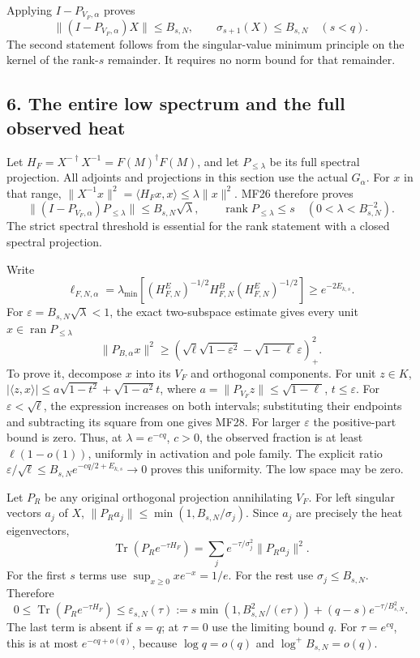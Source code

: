 \documentclass[11pt]{article}
\begin{document}
Applying \(I-P_{V_F,\alpha}\) proves \[
\|(I-P_{V_F,\alpha})X\|\le B_{s,N},\qquad
\sigma_{s+1}(X)\le B_{s,N}\quad(s<q).
\tag{MF26}
\] The second statement follows from the singular-value minimum principle on the kernel of the rank-\(s\) remainder. It requires no norm bound for that remainder.

\subsection{6. The entire low spectrum and the full observed heat}\label{the-entire-low-spectrum-and-the-full-observed-heat}

Let \(H_F=X^{-\dagger}X^{-1}=F(M)^\dagger F(M)\), and let \(P_{\le\lambda}\) be its full spectral projection. All adjoints and projections in this section use the actual \(G_\alpha\). For \(x\) in that range, \(\|X^{-1}x\|^2=\langle H_Fx,x\rangle\le\lambda\|x\|^2\). MF26 therefore proves \[
\boxed{
\|(I-P_{V_F,\alpha})P_{\le\lambda}\|\le B_{s,N}\sqrt\lambda,\qquad
\operatorname{rank}P_{\le\lambda}\le s
\quad(0<\lambda<B_{s,N}^{-2}).}
\tag{MF27}
\] The strict spectral threshold is essential for the rank statement with a closed spectral projection.

Write \[
\ell_{F,N,\alpha}=\lambda_{\min}
[(H^E_{F,N})^{-1/2}H^B_{F,N}(H^E_{F,N})^{-1/2}]
\ge e^{-2E_{k,s}}.
\] For \(\varepsilon=B_{s,N}\sqrt\lambda<1\), the exact two-subspace estimate gives every unit \(x\in\operatorname{ran}P_{\le\lambda}\) \[
\|P_{B,\alpha}x\|^2\ge
\left(\sqrt\ell\sqrt{1-\varepsilon^2}
-\sqrt{1-\ell}\varepsilon\right)_+^2 .
\tag{MF28}
\] To prove it, decompose \(x\) into its \(V_F\) and orthogonal components. For unit \(z\in K\), \(|\langle z,x\rangle|\le
a\sqrt{1-t^2}+\sqrt{1-a^2}t\), where \(a=\|P_{V_F}z\|\le\sqrt{1-\ell}\), \(t\le\varepsilon\). For \(\varepsilon<\sqrt\ell\), the expression increases on both intervals; substituting their endpoints and subtracting its square from one gives MF28. For larger \(\varepsilon\) the positive-part bound is zero. Thus, at \(\lambda=e^{-cq}\), \(c>0\), the observed fraction is at least \(\ell(1-o(1))\), uniformly in activation and pole family. The explicit ratio \(\varepsilon/\sqrt\ell\le B_{s,N}e^{-cq/2+E_{k,s}}\to0\) proves this uniformity. The low space may be zero.

Let \(P_R\) be any original orthogonal projection annihilating \(V_F\). For left singular vectors \(a_j\) of \(X\), \(\|P_Ra_j\|\le\min(1,B_{s,N}/\sigma_j)\). Since \(a_j\) are precisely the heat eigenvectors, \[
\operatorname{Tr}(P_Re^{-\tau H_F})
=\sum_j e^{-\tau/\sigma_j^2}\|P_Ra_j\|^2.
\] For the first \(s\) terms use \(\sup_{x\ge0}xe^{-x}=1/e\). For the rest use \(\sigma_j\le B_{s,N}\). Therefore \[
\boxed{
0\le\operatorname{Tr}(P_Re^{-\tau H_F})
\le\varepsilon_{s,N}(\tau):=
s\min(1,B_{s,N}^2/(e\tau))
+(q-s)e^{-\tau/B_{s,N}^2}.}
\tag{MF29}
\] The last term is absent if \(s=q\); at \(\tau=0\) use the limiting bound \(q\). For \(\tau=e^{cq}\), this is at most \(e^{-cq+o(q)}\), because \(\log q=o(q)\) and \(\log^+B_{s,N}=o(q)\).
\end{document}
